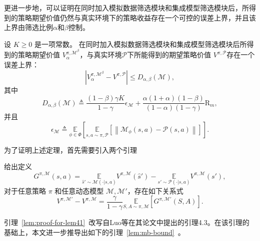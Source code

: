 更进一步地，可以证明在同时加入模拟数据筛选模块和集成模型筛选模块后，所得到的策略期望价值仍然与真实环境下的策略收益存在一个可控的误差上界，并且该上界由筛选比例$\alpha$和$\beta$控制。

\begin{theorem}\label{the:MBDP-bound}

设 $K\geq 0$ 是一项常数。 在同时加入模拟数据筛选模块和集成模型筛选模块后所得到的策略期望价值 ${V}_\alpha^{\pi, \mathcal{M}^\beta}$，与真实环境$\mathcal{P}$下所能得到的期望策略价值 ${V}^{\pi, \mathcal{P}}$存在一个误差上界：
\begin{equation}
\left|{V}_\alpha^{\pi, \mathcal{M}^\beta}-{V}^{\pi, \mathcal{P}}\right|\leq D_{\alpha,\beta}(\mathcal{M}),
\end{equation}
其中
\begin{equation}\label{eq:MBDP-bound}
D_{\alpha,\beta}(\mathcal{M})\triangleq\frac{(1-\beta)\gamma K}{1-\gamma}\epsilon_{\mathcal{M}}+\frac{\alpha(1+\alpha)(1-\beta)}{(1-\alpha)(1-\gamma)}\mathrm{R}_m,
\end{equation}
并且
\begin{equation}\label{def:delta-M}
\epsilon_{\mathcal{M}}\triangleq\underset{\phi\in\Phi}{\mathbb{E}}\left[\underset{s,a\sim \pi,\mathcal{P}}{\mathbb{E}}\left[\left\|\mathcal{M}_\phi(s, a)-\mathcal{P}(s, a)\right\|\right]\right].
\end{equation}

\end{theorem}
为了证明上述定理，首先需要引入两个引理

\begin{lemma}\label{lem:proof-for-lem41}
给出定义
\begin{equation}\label{def:G-sa}
G^{\pi,\mathcal{M}}(s,a)=\underset{\hat{s}'\sim\mathcal{M}(\cdot|s,a)}{\mathbb{E}}{{V}^{\pi,\mathcal{M}}}(\hat{s}') - \underset{s'\sim\mathcal{P}(\cdot|s,a)}{\mathbb{E}}{{V}^{\pi,\mathcal{M}}}(s'),
\end{equation}
对于任意策略 $\pi$ 和任意动态模型 $\mathcal{M},\mathcal{M}'$，存在如下关系式
\begin{equation}
{V}^{\pi,\mathcal{M}'} - {V}^{\pi,\mathcal{M}} = \frac{\gamma}{1-\gamma}\underset{S,A\sim\pi,\mathcal{M}}{\mathbb{E}}\left[G^{\pi,\mathcal{M}'}(S,A)\right].
\end{equation}
\end{lemma}

引理~\ref{lem:proof-for-lem41}~改写自Luo等\cite{luo2018algorithmic}在其论文中提出的引理4.3。在该引理的基础上，本文进一步推导出如下的引理~\ref{lem:mb-bound}~。

